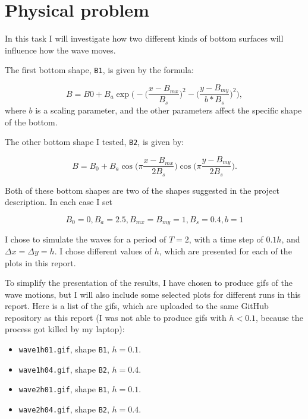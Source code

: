 \documentclass[10pt, a4paper]{amsart}
\numberwithin{figure}{section}
\numberwithin{table}{section}
\begin{document}
\section{Physical problem}

In this task I will investigate how two different kinds of bottom surfaces will
influence how the wave moves.

The first bottom shape, \texttt{B1}, is given by the formula:

\begin{equation}
    B = B0 + B_a \exp\big(-\big(\frac{x - B_{mx}}{B_s}\big)^2- \big(\frac{y -
    B_{my}}{b*B_s}\big)^2\big),
\end{equation}
where $b$ is a scaling parameter, and the other parameters affect the specific
shape of the bottom.

The other bottom shape I tested, \texttt{B2}, is given by:

\begin{equation}
    B = B_0 + B_a \cos\big(\pi \frac{x - B_{mx}}{2B_s}\big) \cos\big(\pi
    \frac{y - B_{my}}{2B_s}\big).
\end{equation}

Both of these bottom shapes are two of the shapes suggested in the project
description. In each case I set

$$B_0 = 0, B_a = 2.5, B_{mx} = B_{my} = 1, B_s = 0.4, b = 1$$

I chose to simulate the waves for a period of $T=2$, with a time step of
$0.1 h$, and $\Delta x = \Delta y = h$. I chose different values of $h$, which
are presented for each of the plots in this report.

To simplify the presentation of the results, I have chosen to produce gifs of
the wave motions, but I will also include some selected plots for different
runs in this report. Here is a list of the gifs, which are uploaded to the same
GitHub repository as this report (I was not able to produce gifs with $h <
0.1$, because the process got killed by my laptop):

\begin{itemize}
    \item \texttt{wave1h01.gif}, shape \texttt{B1}, $h=0.1$.
    \item \texttt{wave1h04.gif}, shape \texttt{B2}, $h=0.4$.
    \item \texttt{wave2h01.gif}, shape \texttt{B1}, $h=0.1$.
    \item \texttt{wave2h04.gif}, shape \texttt{B2}, $h=0.4$.
\end{itemize}
\end{document}
